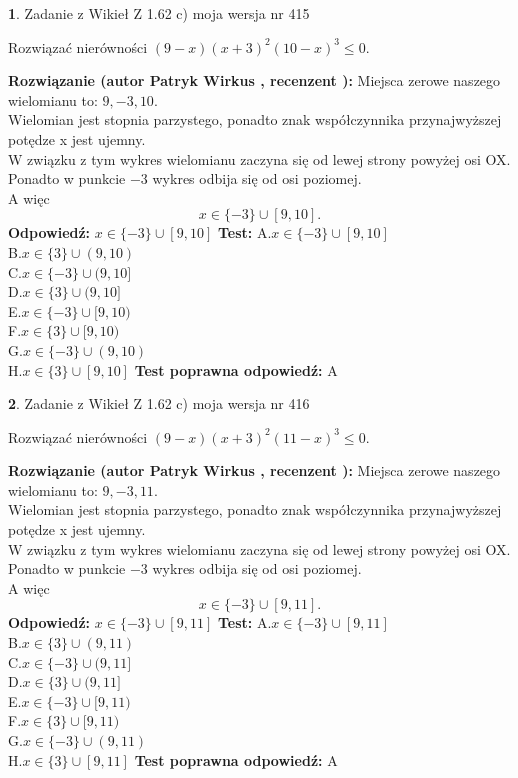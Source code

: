 \documentclass[12pt, a4paper]{article}
\theoremstyle{definition} %
\newtheorem{zad}{}
\newcommand{\zadStart}[1]{\begin{zad}#1\newline}
\newcommand{\zadStop}{\end{zad}}
\newcommand{\rozwStart}[2]{\noindent \textbf{Rozwiązanie (autor #1 , recenzent #2): }\newline}
\newcommand{\rozwStop}{\newline}
\newcommand{\odpStart}{\noindent \textbf{Odpowiedź:}\newline}
\newcommand{\odpStop}{\newline}
\newcommand{\testStart}{\noindent \textbf{Test:}\newline}
\newcommand{\testStop}{\newline}
\newcommand{\kluczStart}{\noindent \textbf{Test poprawna odpowiedź:}\newline}
\newcommand{\kluczStop}{\newline}
\begin{document}
\zadStart{Zadanie z Wikieł Z 1.62 c) moja wersja nr 415}

Rozwiązać nierówności $(9-x)(x+3)^{2}(10-x)^{3}\le0$.
\zadStop
\rozwStart{Patryk Wirkus}{}
Miejsca zerowe naszego wielomianu to: $9, -3, 10$.\\
Wielomian jest stopnia parzystego, ponadto znak współczynnika przy\linebreak najwyższej potędze x jest ujemny.\\ W związku z tym wykres wielomianu zaczyna się od lewej strony powyżej osi OX.\\
Ponadto w punkcie $-3$ wykres odbija się od osi poziomej.\\
A więc $$x \in \{-3\} \cup [9,10].$$
\rozwStop
\odpStart
$x \in \{-3\} \cup [9,10]$
\odpStop
\testStart
A.$x \in \{-3\} \cup [9,10]$\\
B.$x \in \{3\} \cup (9,10)$\\
C.$x \in \{-3\} \cup (9,10]$\\
D.$x \in \{3\} \cup (9,10]$\\
E.$x \in \{-3\} \cup [9,10)$\\
F.$x \in \{3\} \cup [9,10)$\\
G.$x \in \{-3\} \cup (9,10)$\\
H.$x \in \{3\} \cup [9,10]$
\testStop
\kluczStart
A
\kluczStop



\zadStart{Zadanie z Wikieł Z 1.62 c) moja wersja nr 416}

Rozwiązać nierówności $(9-x)(x+3)^{2}(11-x)^{3}\le0$.
\zadStop
\rozwStart{Patryk Wirkus}{}
Miejsca zerowe naszego wielomianu to: $9, -3, 11$.\\
Wielomian jest stopnia parzystego, ponadto znak współczynnika przy\linebreak najwyższej potędze x jest ujemny.\\ W związku z tym wykres wielomianu zaczyna się od lewej strony powyżej osi OX.\\
Ponadto w punkcie $-3$ wykres odbija się od osi poziomej.\\
A więc $$x \in \{-3\} \cup [9,11].$$
\rozwStop
\odpStart
$x \in \{-3\} \cup [9,11]$
\odpStop
\testStart
A.$x \in \{-3\} \cup [9,11]$\\
B.$x \in \{3\} \cup (9,11)$\\
C.$x \in \{-3\} \cup (9,11]$\\
D.$x \in \{3\} \cup (9,11]$\\
E.$x \in \{-3\} \cup [9,11)$\\
F.$x \in \{3\} \cup [9,11)$\\
G.$x \in \{-3\} \cup (9,11)$\\
H.$x \in \{3\} \cup [9,11]$
\testStop
\kluczStart
A
\kluczStop
\end{document}
